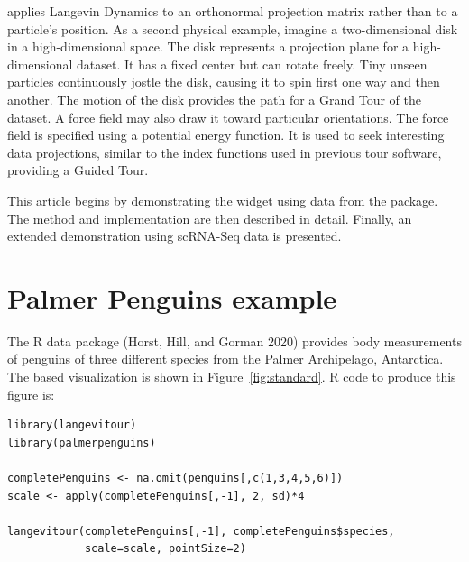  applies Langevin Dynamics to an orthonormal projection matrix rather than to a particle's position. As a second physical example, imagine a two-dimensional disk in a high-dimensional space. The disk represents a projection plane for a high-dimensional dataset. It has a fixed center but can rotate freely. Tiny unseen particles continuously jostle the disk, causing it to spin first one way and then another. The motion of the disk provides the path for a Grand Tour of the dataset. A force field may also draw it toward particular orientations. The force field is specified using a potential energy function. It is used to seek interesting data projections, similar to the index functions used in previous tour software, providing a Guided Tour.

This article begins by demonstrating the widget using data from the  package. The method and implementation are then described in detail. Finally, an extended demonstration using scRNA-Seq data is presented.

\hypertarget{palmer-penguins-example}{%
\section{Palmer Penguins example}\label{palmer-penguins-example}}

The R data package  (Horst, Hill, and Gorman 2020) provides body measurements of penguins of three different species from the Palmer Archipelago, Antarctica. The  based visualization is shown in Figure~\ref{fig:standard}. R code to produce this figure is:

\begin{verbatim}
library(langevitour)
library(palmerpenguins)

completePenguins <- na.omit(penguins[,c(1,3,4,5,6)])
scale <- apply(completePenguins[,-1], 2, sd)*4

langevitour(completePenguins[,-1], completePenguins$species, 
            scale=scale, pointSize=2)
\end{verbatim}

